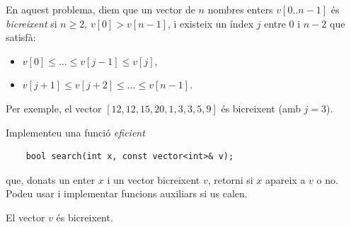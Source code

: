 

\Statement

En aquest problema,
diem que un vector de $n$ nombres enters $v[0..n-1]$
és \emph{bicreixent}
si $n \ge 2$,
$v[0] > v[n-1]$,
i existeix un índex $j$ entre $0$ i $n-2$ que satisfà:
\begin{itemize}
\item $v[0] \le \ldots \le v[j-1] \le v[j]$,
\item $v[j+1] \le v[j+2] \le \ldots \le v[n-1]$.
\end{itemize}

\smallskip

Per exemple, el vector
$[12, 12, 15, 20, 1, 3, 3, 5, 9]$
és bicreixent (amb $j = 3$).

\bigskip

Implementeu una funció \emph{eficient}

\begin{lstlisting}
    bool search(int x, const vector<int>& v);
\end{lstlisting}

que, donats un enter $x$ i un vector bicreixent $v$,
retorni si $x$ apareix a $v$ o no.
Podeu usar i implementar funcions auxiliars si us calen.


\Precondition

El vector $v$ és bicreixent.


\ObservationNoMain


